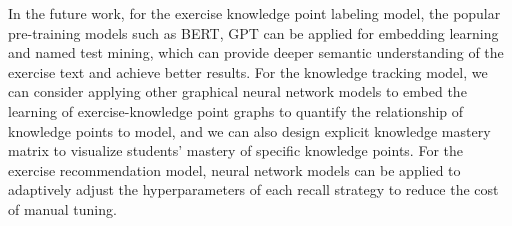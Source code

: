 
In the future work, for the exercise knowledge point labeling model, the popular pre-training models such as BERT, GPT can be applied for embedding learning and named test mining, which can provide deeper semantic understanding of the exercise text and achieve better results. For the knowledge tracking model, we can consider applying other graphical neural network models to embed the learning of exercise-knowledge point graphs to quantify the relationship of knowledge points to model, and we can also design explicit knowledge mastery matrix to visualize students' mastery of specific knowledge points. For the exercise recommendation model, neural network models can be applied to adaptively adjust the hyperparameters of each recall strategy to reduce the cost of manual tuning.